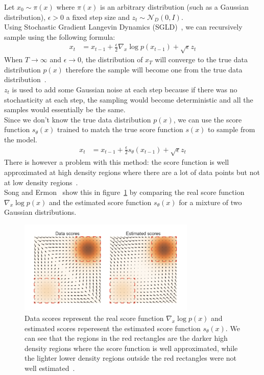 \documentclass[twoside]{article}
\numberwithin{equation}{section}
\numberwithin{figure}{section}
\begin{document}
Let $x_0 \sim \pi (x)$ where $\pi (x)$ is an arbitrary distribution (such as a Gaussian distribution), $\epsilon > 0$ a fixed step size and $z_t \sim \mathcal{N}_D (0, I)$. \\
Using Stochastic Gradient Langevin Dynamics (SGLD)~\cite{song2020generative, WelTeh2011a}, we can recursively sample using the following formula:
\begin{align}
  x_t &= x_{t-1} + \frac{\epsilon}{2} \nabla_x \log p(x_{t-1}) + \sqrt{\epsilon} z_t
\end{align}
When $T \rightarrow \infty$ and $\epsilon \rightarrow 0$, the distribution of $x_T$ will converge to the true data distribution $p(x)$ therefore the sample will become one from the true data distribution~\cite{song2020generative,WelTeh2011a}. \\
$z_t$ is used to add some Gaussian noise at each step because if there was no stochasticity at each step, the sampling would become deterministic and all the samples would essentially be the same.\\
Since we don't know the true data distribution $p(x)$, we can use the score function $s_\theta (x)$ trained to match the true score function $s(x)$ to sample from the model. \\
\begin{align}
  x_t &= x_{t-1} + \frac{\epsilon}{2} s_\theta (x_{t-1}) + \sqrt{\epsilon} z_t
\end{align}
There is however a problem with this method: the score function is well approximated at high density regions where there are a lot of data points but not at low density regions~\cite{song2020generative}. \\
Song and Ermon~\cite{song2020generative} show this in figure~\ref{fig:scores} by comparing the real score function $\nabla_x \log p(x)$ and the estimated score function $s_\theta (x)$ for a mixture of two Gaussian distributions.
\begin{figure}[h]
  \begin{center}
    \includegraphics[width= 0.75\textwidth]{images/highlowdensity.png}
    \caption{Data scores represent the real score function $\nabla_x \log p(x)$ and estimated scores reperesent the estimated score function $s_\theta (x)$. We can see that the regions in the red rectangles are the darker high density regions where the score function is well approximated, while the lighter lower density regions outside the red rectangles were not well estimated~\cite{song2020generative}.}\label{fig:scores}
  \end{center}
\end{figure}
\end{document}
